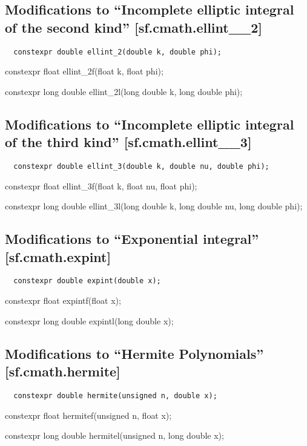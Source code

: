 \documentclass[prd,twocolumn,amsmath,amssymb,nofootinbib,eqsecnum]{revtex4-1}
\newcommand{\code}[1]{{\tt #1}}
\newcommand{\highlight}[1]{{\color{red} #1}}
\begin{document}
\subsection{Modifications to  ``Incomplete elliptic integral of the second kind''  [sf.cmath.ellint\_\_2]}

\code{
	\highlight{constexpr} double ellint\_2(double k, double phi);
	
	\highlight{constexpr} float ellint\_2f(float k, float phi);
	
	\highlight{constexpr} long double ellint\_2l(long double k, long double phi);

}

\subsection{Modifications to  ``Incomplete elliptic integral of the third kind''  [sf.cmath.ellint\_\_3]}

\code{
	\highlight{constexpr} double ellint\_3(double k, double nu, double phi);
	
	\highlight{constexpr} float ellint\_3f(float k, float nu, float phi);
	
	\highlight{constexpr} long double ellint\_3l(long double k, long double nu, long double phi);

}

\subsection{Modifications to  ``Exponential integral''  [sf.cmath.expint]}

\code{
	\highlight{constexpr} double expint(double x);
	
	\highlight{constexpr} float expintf(float x);
	
	\highlight{constexpr} long double expintl(long double x);

}

\subsection{Modifications to  ``Hermite Polynomials''  [sf.cmath.hermite]}

\code{
	\highlight{constexpr} double hermite(unsigned n, double x);
	
	\highlight{constexpr} float hermitef(unsigned n, float x);
	
	\highlight{constexpr} long double hermitel(unsigned n, long double x);

}
\end{document}
